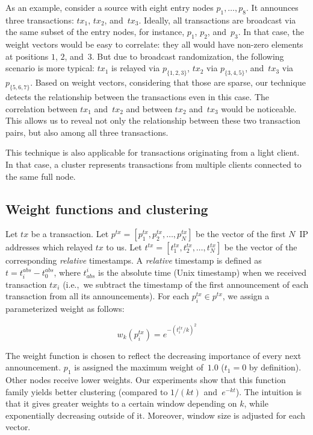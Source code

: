 As an example, consider a source with eight entry nodes $p_1, \dots, p_8$.
It announces three transactions: $tx_1$, $tx_2$, and~$tx_3$.
Ideally, all transactions are broadcast via the same subset of the entry nodes, for instance, $p_1$, $p_2$, and~$p_3$.
In that case, the weight vectors would be easy to correlate: they all would have non-zero elements at positions $1$, $2$, and~$3$.
But due to broadcast randomization, the following scenario is more typical: $tx_1$ is relayed via $p_{\{1,2,3\}}$, $tx_2$ via $p_{\{3,4,5\}}$, and~$tx_3$ via $p_{\{5,6,7\}}$.
Based on weight vectors, considering that those are sparse, our technique detects the relationship between the transactions even in this case.
The correlation between $tx_1$ and~$tx_2$ and between $tx_2$ and~$tx_3$ would be noticeable.
This allows us to reveal not only the relationship between these two transaction pairs, but also among all three transactions.

This technique is also applicable for transactions originating from a light client.
In that case, a cluster represents transactions from multiple clients connected to the same full node.


\subsection{Weight functions and clustering}

Let $tx$ be a transaction.
Let $p^{tx} = [p^{tx}_1, p^{tx}_2, \dots, p^{tx}_N]$ be the vector of the first $N$~IP addresses which relayed $tx$ to us.
Let $t^{tx} = [t^{tx}_1, t^{tx}_2, \dots, t^{tx}_N]$ be the vector of the corresponding \textit{relative} timestamps.
A \textit{relative} timestamp is defined as $t = t^{abs}_i - t^{abs}_0$, where $t_{abs}^i$ is the absolute time (Unix timestamp) when we received transaction $tx_i$ (i.e.,~we subtract the timestamp of the first announcement of each transaction from all its announcements).
For each $p^{tx}_i \in p^{tx}$, we assign a parameterized weight as follows:

\[
w_k(p^{tx}_i) = e^{-(t^{tx}_i/k)^2}
\]

The weight function is chosen to reflect the decreasing importance of every next announcement.
$p_1$ is assigned the maximum weight of~$1.0$ ($t_1=0$ by definition).
Other nodes receive lower weights.
Our experiments show that this function family yields better clustering (compared to $1/(kt)$ and~$e^{-kt}$).
The intuition is that it gives greater weights to a certain window depending on $k$, while exponentially decreasing outside of it.
Moreover, window size is adjusted for each vector.

